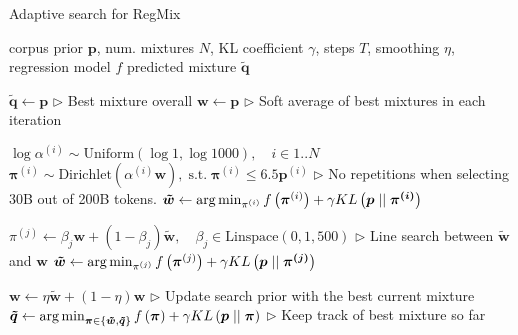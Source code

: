 \begin{algorithm}[!ht]
\small
\caption{Adaptive search for RegMix}
\label{alg:adaptive_search}
\begin{algorithmic}[1]
    \REQUIRE corpus prior $\boldsymbol{p}$, num. mixtures $N$, KL coefficient $\gamma$, steps $T$, smoothing $\eta$, regression model $f$
    \ENSURE predicted mixture $\boldsymbol{\tilde q}$

    \STATE $\boldsymbol{\tilde q} \gets \boldsymbol{p}$
        \hfill {$\triangleright$ Best mixture overall}
    \STATE $\boldsymbol{w} \gets \boldsymbol{p}$
        \hfill {$\triangleright$  Soft average of best mixtures in each iteration}

    \STATE $\log \alpha^{(i)} \sim \text{Uniform}(\log 1, \log 1000), \quad i \in 1..N$
    \STATE $\boldsymbol{\pi}^{(i)} \sim \text{Dirichlet}(\alpha^{(i)} \boldsymbol{w}), \; \text{s.t.} \; {\boldsymbol{\pi}^{(i)}} \le 6.5{\boldsymbol{p}^{(i)}}$
        \hfill {$\triangleright$   No repetitions when selecting 30B out of 200B tokens.}
    \STATE $\boldsymbol{\tilde w} \gets \operatorname*{arg\,min}_{\pi^{(i)}} f\left(\boldsymbol{\pi}^{(i)}\right) + \gamma KL\left( \boldsymbol{p}\;||\;\boldsymbol{\pi^{(i)}} \right)$

    \vskip 0.1in
    \STATE $\pi^{(j)} \gets \beta_j \boldsymbol{w} + (1-\beta_j)\boldsymbol{\tilde w}, \quad \beta_j \in \text{Linspace}(0, 1, 500)$
        \hfill {$\triangleright$ Line search between $\boldsymbol{\tilde w}$ and $\boldsymbol{w}$}
    \STATE $\boldsymbol{\tilde w} \gets \operatorname*{arg\,min}_{\pi^{(j)}} f\left(\boldsymbol{\pi}^{(j)}\right) + \gamma KL\left( \boldsymbol{p}\;||\;\boldsymbol{\pi^{(j)}} \right)$

    \vskip 0.1in
    \STATE $\boldsymbol{w} \gets \eta \boldsymbol{\tilde w} + (1-\eta)\boldsymbol{w}$
        \hfill {$\triangleright$ Update search prior with the best current mixture}
    \STATE $\boldsymbol{\tilde q} \gets \operatorname*{arg\,min}_{\boldsymbol{\pi} \in \{\boldsymbol{\tilde w}, \boldsymbol{\tilde q}\}} f\left(\boldsymbol{\pi} \right) + \gamma KL\left( \boldsymbol{p}\;||\;\boldsymbol{\pi} \right)$
        \hfill {$\triangleright$ Keep track of best mixture so far}

    \ENDFOR{}
\end{algorithmic}
\end{algorithm}



